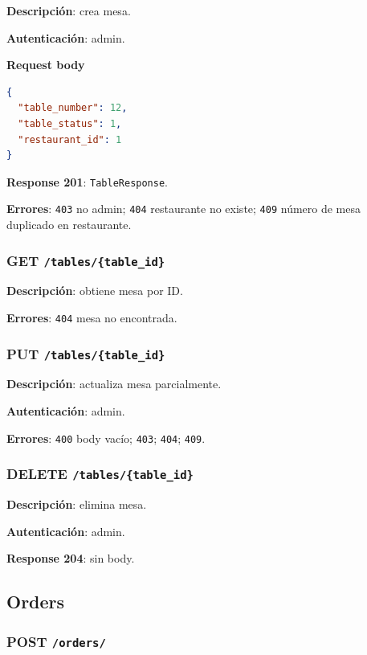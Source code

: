 \documentclass[12pt,letterpaper]{article}
\def\codefile#1{\nolinkurl{#1}}
\def\methodget{\textbf{\color{blue!60!black}GET}}
\def\methodpost{\textbf{\color{green!45!black}POST}}
\def\methodput{\textbf{\color{orange!80!black}PUT}}
\def\methoddelete{\textbf{\color{red!70!black}DELETE}}
\begin{document}
\textbf{Descripción}: crea mesa.

\textbf{Autenticación}: admin.

\textbf{Request body}
\begin{lstlisting}[language=json]
{
  "table_number": 12,
  "table_status": 1,
  "restaurant_id": 1
}
\end{lstlisting}

\textbf{Response 201}: \codefile{TableResponse}.

\textbf{Errores}: \codefile{403} no admin; \codefile{404} restaurante no existe; \codefile{409} número de mesa duplicado en restaurante.

\subsubsection{\methodget{} \texttt{/tables/\{table\_id\}}}

\textbf{Descripción}: obtiene mesa por ID.

\textbf{Errores}: \codefile{404} mesa no encontrada.

\subsubsection{\methodput{} \texttt{/tables/\{table\_id\}}}

\textbf{Descripción}: actualiza mesa parcialmente.

\textbf{Autenticación}: admin.

\textbf{Errores}: \codefile{400} body vacío; \codefile{403}; \codefile{404}; \codefile{409}.

\subsubsection{\methoddelete{} \texttt{/tables/\{table\_id\}}}

\textbf{Descripción}: elimina mesa.

\textbf{Autenticación}: admin.

\textbf{Response 204}: sin body.

\subsection{Orders}

\subsubsection{\methodpost{} \codefile{/orders/}}
\end{document}
